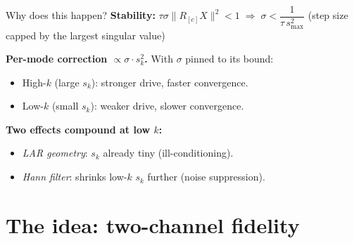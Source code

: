 \documentclass[aspectratio=169,xcolor=dvipsnames]{beamer}
\begin{document}
\begin{frame}{Why does this happen?}
  \textbf{Stability:}\;
  $\tau \sigma \|R_{[c]}X\|^2 < 1 \;\Longrightarrow\; \sigma < \dfrac{1}{\tau\,s_{\max}^2}$
   (step size capped by the largest singular value)

  \medskip
  \textbf{Per-mode correction $\propto \sigma \cdot s_k^2$.}
  With $\sigma$ pinned to its bound:
  \begin{itemize}\setlength\itemsep{0pt}
    \item High-$k$ (large $s_k$): stronger drive, faster convergence.
    \item Low-$k$ (small $s_k$): weaker drive, slower convergence.
  \end{itemize}

  \medskip
  \textbf{Two effects compound at low $k$:}
  \begin{itemize}\setlength\itemsep{0pt}
    \item \emph{LAR geometry}: $s_k$ already tiny (ill-conditioning).
    \item \emph{Hann filter}: shrinks low-$k$ $s_k$ further (noise
          suppression).
  \end{itemize}
\end{frame}

\section[Two-channel]{The idea: two-channel fidelity}
\end{document}
